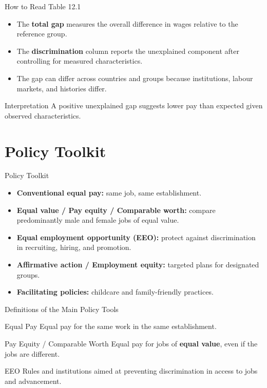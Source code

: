 \documentclass[aspectratio=169]{beamer}
\begin{document}
\begin{frame}{How to Read Table 12.1}
\transfade
\begin{itemize}[<+->]
  \item The \textbf{total gap} measures the overall difference in wages relative to the reference group.
  \item The \textbf{discrimination} column reports the unexplained component after controlling for measured characteristics.
  \item The gap can differ across countries and groups because institutions, labour markets, and histories differ.
\end{itemize}

\begin{block}{Interpretation}
A positive unexplained gap suggests lower pay than expected given observed characteristics.
\end{block}
\end{frame}

\section{Policy Toolkit}

\begin{frame}{Policy Toolkit}
\transfade
\begin{itemize}[<+->]
  \item \textbf{Conventional equal pay:} same job, same establishment.
  \item \textbf{Equal value / Pay equity / Comparable worth:} compare predominantly male and female jobs of equal value.
  \item \textbf{Equal employment opportunity (EEO):} protect against discrimination in recruiting, hiring, and promotion.
  \item \textbf{Affirmative action / Employment equity:} targeted plans for designated groups.
  \item \textbf{Facilitating policies:} childcare and family-friendly practices.
\end{itemize}
\end{frame}

\begin{frame}{Definitions of the Main Policy Tools}
\transfade
\begin{block}{Equal Pay}
Equal pay for the same work in the same establishment.
\end{block}

\begin{block}{Pay Equity / Comparable Worth}
Equal pay for jobs of \textbf{equal value}, even if the jobs are different.
\end{block}

\begin{block}{EEO}
Rules and institutions aimed at preventing discrimination in access to jobs and advancement.
\end{block}
\end{frame}
\end{document}
